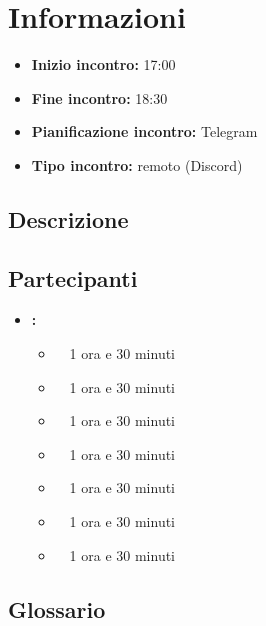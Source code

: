 \section{Informazioni}
\begin{itemize}
	\item \textbf{Inizio incontro:} 17:00
	\item \textbf{Fine incontro:} 18:30
	\item \textbf{Pianificazione incontro:} Telegram
	\item \textbf{Tipo incontro:} remoto (Discord)
\end{itemize}

\subsection{Descrizione}
\DocDescription

\subsection{Partecipanti}

\begin{itemize}
	\item \textbf{\GroupName:}
	\begin{itemize}
		\item \tommaso \ \rightarrow\ 1 ora e 30 minuti
		\item \marco \ \rightarrow\ 1 ora e 30 minuti
		\item \riccardo \ \rightarrow\ 1 ora e 30 minuti
		\item \raul \ \rightarrow\ 1 ora e 30 minuti
		\item \martina \ \rightarrow\ 1 ora e 30 minuti
		\item \sebastiano \ \rightarrow\ 1 ora e 30 minuti
		\item \mattia \ \rightarrow\ 1 ora e 30 minuti
	\end{itemize}
\end{itemize}

\subsection{Glossario}
\GlossarioIntroduzione

\clearpage